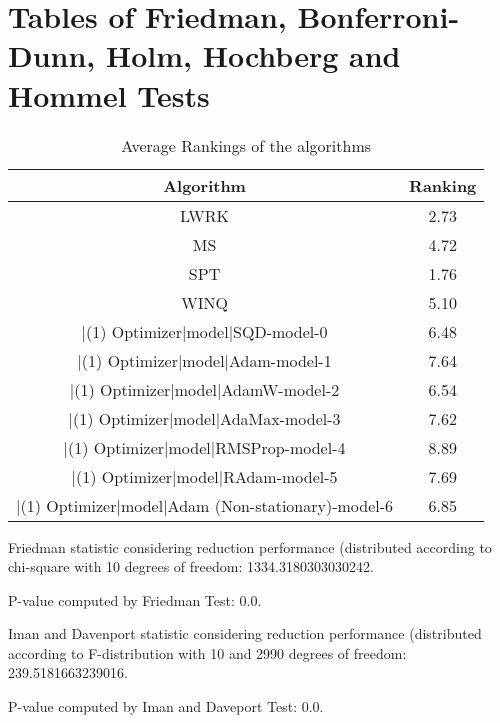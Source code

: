 \documentclass[a3paper,10pt]{article}
\author{}
\date{\today}
\begin{document}
\oddsidemargin 0in \topmargin 0in\maketitle
\section{Tables of Friedman, Bonferroni-Dunn, Holm, Hochberg and Hommel Tests}
\begin{table}[!htp]
\centering
\caption{Average Rankings of the algorithms
}\begin{tabular}{c|c}
Algorithm&Ranking\\
\hline
LWRK&2.73\\
MS&4.72\\
SPT&1.76\\
WINQ&5.10\\
|(1) Optimizer|model|SQD-model-0&6.48\\
|(1) Optimizer|model|Adam-model-1&7.64\\
|(1) Optimizer|model|AdamW-model-2&6.54\\
|(1) Optimizer|model|AdaMax-model-3&7.62\\
|(1) Optimizer|model|RMSProp-model-4&8.89\\
|(1) Optimizer|model|RAdam-model-5&7.69\\
|(1) Optimizer|model|Adam (Non-stationary)-model-6&6.85\\
\end{tabular}
\end{table}


Friedman statistic considering reduction performance (distributed according to chi-square with 10 degrees of freedom: 1334.3180303030242.


P-value computed by Friedman Test: 0.0.\newline

Iman and Davenport statistic considering reduction performance (distributed according to F-distribution with 10 and 2990 degrees of freedom: 239.5181663239016.


P-value computed by Iman and Daveport Test: 0.0.\newline
\end{document}
